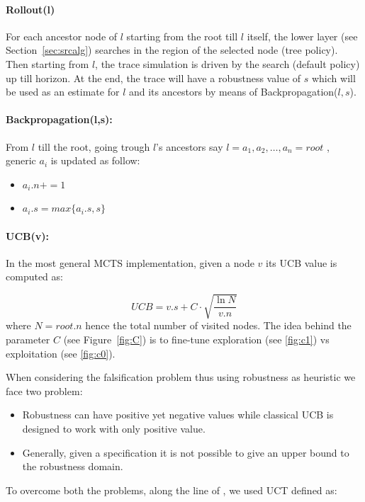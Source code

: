 \documentclass[11pt]{article}
\begin{document}
\paragraph{Rollout(l)} For each ancestor node of $l$ starting from the root till $l$ itself, the lower layer (see Section~\ref{sec:srcalg}) searches in the region of the selected node (tree policy). Then starting from $l$, the  trace simulation is driven by the search (default policy) up till horizon. At the end, the trace will have a robustness value of $s$ which will be used as an estimate for $l$ and its ancestors by means of Backpropagation($l,s$).

\paragraph{Backpropagation(l,s):} From $l$ till the root, going trough $l$'s ancestors say $l=a_1, a_2, \dots, a_n=root$ , generic $a_i$ is updated as follow:
\begin{itemize}
    \item $a_i.n+=1$
    \item $a_i.s=max\{a_i.s, s\}$
\end{itemize}

\paragraph{UCB(v):} In the most general MCTS implementation, given a node $v$ its UCB value is computed as:

\begin{equation}
    UCB = v.s + C \cdot \sqrt{\frac{\ln N}{v.n}}
\end{equation}
where $N = root.n$ hence the total number of visited nodes. The idea behind the parameter $C$ (see Figure~\ref{fig:C}) is to fine-tune exploration (see \ref{fig:c1}) vs exploitation (see \ref{fig:c0}). 

When considering the falsification problem thus using robustness as heuristic we face two problem:
\begin{itemize}
    \item Robustness can have positive yet negative values while classical UCB is designed to work with only positive value. 
    \item Generally, given a specification it is not possible to give an upper bound to the robustness domain. 
\end{itemize}
To overcome both the problems, along the line of \cite{zhang2018two}, we used UCT defined as:
\end{document}
